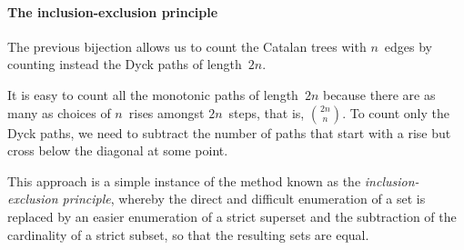 \documentclass[11pt]{article}
\begin{document}
\paragraph{The inclusion-exclusion principle}

The previous bijection allows us to count the Catalan trees with
\(n\)~edges by counting instead the Dyck paths of length~\(2n\). 

It is easy to count all the monotonic paths of length~\(2n\) because
there are as many as choices of \(n\)~rises amongst \(2n\)~steps, that
is, \(\binom{2n}{n}\). To count only the Dyck paths, we need to
subtract the number of paths that start with a rise but cross below the
diagonal at some point.

This approach is a simple instance of the method known as the
\emph{inclusion\hyp{}exclusion principle}, whereby the direct and
difficult enumeration of a set is replaced by an easier enumeration
of a strict superset and the subtraction of the cardinality of a strict
subset, so that the resulting sets are equal.
\end{document}
